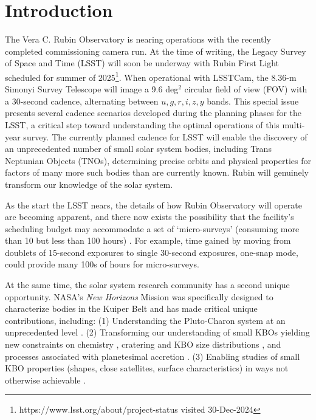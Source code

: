 \documentclass[modern,preprint]{aastex7}
\begin{document}
\section{Introduction}
The Vera C. Rubin Observatory is nearing operations with the recently completed commissioning camera run. At the time of writing, the Legacy Survey of Space and Time (LSST) will soon be underway with Rubin First Light scheduled for summer of 2025\footnote{https://www.lsst.org/about/project-status visited 30-Dec-2024}. 
When operational with LSSTCam, the 8.36-m Simonyi Survey Telescope will image a 9.6 deg$^2$ circular field of view (FOV) with a 30-second cadence, alternating between $u,g,r,i,z,y$ bands.  
This special issue presents several cadence scenarios developed during the planning phases for the LSST, a critical step toward understanding the optimal operations of this multi-year survey.
The currently planned cadence for LSST  will enable the discovery of an unprecedented number of small solar system bodies, including Trans Neptunian Objects (TNOs), determining precise orbits and physical properties for factors of many more such bodies than are currently known. 
Rubin will genuinely transform our knowledge of the solar system.

As the start the LSST nears, the details of how Rubin Observatory will operate are becoming apparent, and there now exists the possibility that the facility's scheduling budget may accommodate a set of `micro-surveys' (consuming more than 10 but less than 100 hours) .
For example, time gained by moving from doublets of 15-second exposures to single 30-second exposures, one-snap mode, could provide many 100s of hours for micro-surveys.

At the same time, the solar system research community has a second unique opportunity. 
NASA's {\it New Horizons} Mission was specifically designed to characterize bodies in the Kuiper Belt and has made critical unique contributions, including: (1) Understanding the Pluto-Charon system at an unprecedented level \citep[e.g.][]{Stern2019, Stern2015, DESCH2017, WONG2017, KRASNOPOLSKY2020}.
(2) Transforming our understanding of small KBOs \citep{Stern2019} yielding new constraints on chemistry \citep{Grundy2020}, cratering and KBO size distributions \citep{Singer2019, Robbins21}, and processes associated with planetesimal accretion \citep[e.g.][]{Nesvorny2021, Nesvorny2022, Nesvorny2023, Nesvorny2023PSJ, Stern2019, Stern2023, McKinnon2020}. (3) Enabling studies of small KBO properties (shapes, close satellites, surface characteristics) in ways not otherwise achievable \citep{Porter2016, Verbiscer2019, Verbiscer2022}. 
\end{document}
